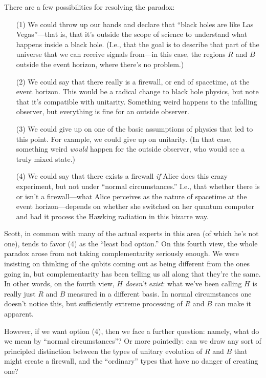 \documentclass[11pt]{report}
\theoremstyle{plain}
\theoremstyle{definition}
\begin{document}
There are a few possibilities for resolving the paradox:
\begin{itemize}
\item[(1)] We could throw up our hands and declare that ``black holes are like Las Vegas''---that is, that it's outside the scope of science
to understand what happens inside a black hole.  (I.e., that the goal is to describe that part of the universe that we can receive signals from---in this case, the regions $R$ and $B$ outside the event horizon, where there's no problem.)
\item[(2)] We could say that there really is a firewall, or end of spacetime, at the event horizon.
This would be a radical change to black hole physics, but note that it's compatible with unitarity.  Something weird happens to the
infalling observer, but everything is fine for an outside observer.
\item[(3)] We could give up on one of the basic assumptions of physics that
led to this point. For example, we could give up on unitarity.
(In that case, something weird {\em would} happen for the outside observer, who would
see a truly mixed state.)
\item[(4)] We could say that there exists a firewall {\em if} Alice does this crazy experiment,
but not under ``normal circumstances.''  I.e., that whether there is or isn't a firewall---what Alice perceives as the
nature of spacetime at the event horizon---depends on whether she switched on her quantum
computer and had it process the Hawking radiation in this bizarre way.
\end{itemize}

Scott, in common with many of the actual experts in this area (of which he's not one), tends to favor (4) as the ``least bad option.''
On this fourth view, the whole paradox arose from not taking complementarity seriously enough.
We were insisting on thinking of the qubits coming out as being
different from the ones going in, but complementarity has been telling us
all along that they're the same.  In other words, on the fourth view, $H$ {\em doesn't exist}: what we've been calling
$H$ is really just $R$ and $B$ measured in a different basis.  In normal circumstances one doesn't notice this,
but sufficiently extreme processing of $R$ and $B$ can make it apparent.

However, if we want option (4), then we face a further question: namely, what do we mean by ``normal circumstances''?
Or more pointedly: can we draw any sort of principled distinction between the types of unitary evolution of $R$ and $B$ that might create a firewall,
and the ``ordinary'' types that have no danger of creating one?
\end{document}
